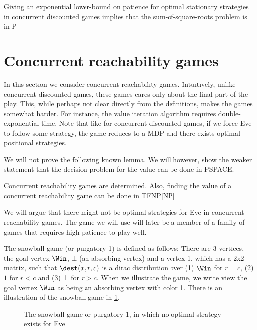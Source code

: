 \begin{lemma}
Giving an exponential lower-bound on patience for optimal stationary strategies in concurrent discounted games implies that the sum-of-square-roots problem is in P
\end{lemma}





\section{Concurrent reachability games}
In this section we consider concurrent reachability games. 
Intuitively, unlike concurrent discounted games, these games cares only about the final part of the play.
This, while perhaps not clear directly from the definitions, makes the games somewhat harder. For instance, the value iteration algorithm requires double-exponential time.
Note that like for concurrent discounted games, if we force Eve to follow some strategy, the game reduces to a MDP and there exists optimal positional strategies.

We will not prove the following known lemma. We will however, show the weaker statement that the decision problem for the value can be done in PSPACE.

\begin{lemma}\label{lemm:reach_determined}
Concurrent reachability games are determined. Also, finding the value of a concurrent reachability game can be done in TFNP[NP]
\end{lemma}


We will argue that there might not be optimal strategies for Eve in concurrent reachability games. 
The game we will use will later be a member of a family of games that requires high patience to play well.

The snowball game (or purgatory 1) is defined as follows:
There are 3 vertices, the goal vertex $\Win$, $\bot$ (an absorbing vertex) and a vertex 1, which has a 2x2 matrix, such that $\dest(x,r,c)$ is a dirac distribution over (1)
$\Win$ for $r=c$, (2) $1$ for $r<c$ and (3) $\bot$ for $r>c$.
When we illustrate the game, we write view the goal vertex $\Win$ as being an absorbing vertex with color 1.
There is an illustration of the snowball game in \ref{fig:snowball}. 

\begin{figure}

\center
{}
\caption{The snowball game or purgatory 1, in which no optimal strategy exists for Eve}\label{fig:snowball}
\end{figure}


